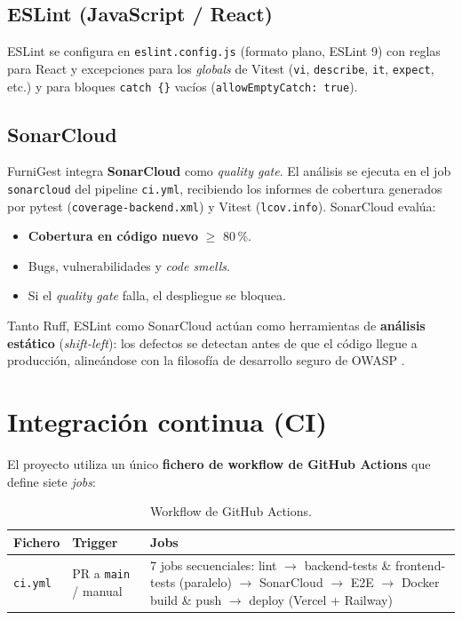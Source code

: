\documentclass[12pt,twoside,titlepage]{report}
\begin{document}
\subsection{ESLint (JavaScript / React)}

ESLint se configura en \texttt{eslint.config.js} (formato plano, ESLint 9) con reglas para React y excepciones para los \emph{globals} de Vitest (\texttt{vi}, \texttt{describe}, \texttt{it}, \texttt{expect}, etc.) y para bloques \texttt{catch \{\}} vacíos (\texttt{allowEmptyCatch: true}).

\subsection{SonarCloud}

FurniGest integra \textbf{SonarCloud} \cite{sonarcloud} como \emph{quality gate}. El análisis se ejecuta en el job \texttt{sonarcloud} del pipeline \texttt{ci.yml}, recibiendo los informes de cobertura generados por pytest (\texttt{coverage-backend.xml}) y Vitest (\texttt{lcov.info}). SonarCloud evalúa:

\begin{itemize}[nosep]
  \item \textbf{Cobertura en código nuevo} $\geq$ 80\,\%.
  \item Bugs, vulnerabilidades y \emph{code smells}.
  \item Si el \emph{quality gate} falla, el despliegue se bloquea.
\end{itemize}

Tanto Ruff, ESLint como SonarCloud actúan como herramientas de \textbf{análisis estático} (\emph{shift-left}): los defectos se detectan antes de que el código llegue a producción, alineándose con la filosofía de desarrollo seguro de OWASP \cite{owasp2021}.


\section{Integración continua (CI)}

El proyecto utiliza un único \textbf{fichero de workflow de GitHub Actions} \cite{githubactions} que define siete \emph{jobs}:

\begin{table}[H]
  \centering
  \caption{Workflow de GitHub Actions.}
  \label{tab:workflows}
  \begin{tabularx}{\textwidth}{llX}
    \toprule
    \textbf{Fichero} & \textbf{Trigger} & \textbf{Jobs} \\
    \midrule
    \texttt{ci.yml} & PR a \texttt{main} / manual & 7 jobs secuenciales: lint $\to$ backend-tests \& frontend-tests (paralelo) $\to$ SonarCloud $\to$ E2E $\to$ Docker build \& push $\to$ deploy (Vercel + Railway) \\
    \bottomrule
  \end{tabularx}
\end{table}
\end{document}
